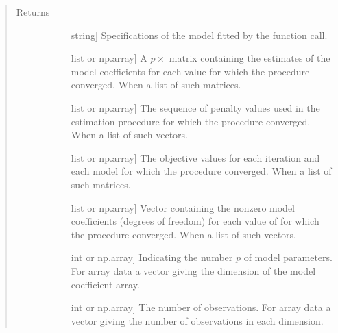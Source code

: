 \documentclass[letterpaper,10pt,english]{sphinxmanual}
\begin{document}
\begin{fulllineitems}
\begin{quote}
\begin{description}
\begin{description}
\end{description}

\item[{Returns}] \leavevmode\begin{description}
\item[{}] \leavevmode{[}string{]}
\sphinxAtStartPar
Specifications of the model fitted by the function call.

\item[{}] \leavevmode{[}list or np.array{]}
\sphinxAtStartPar
A \(p \times\)  matrix containing the
estimates of the model coefficients for each   \sphinxhyphen{}value
for which the procedure converged. When   
a   \sphinxhyphen{}list of such matrices.

\item[{}] \leavevmode{[}list or np.array{]}
\sphinxAtStartPar
The sequence of penalty values used
in the estimation procedure for which the procedure converged.
When    a   \sphinxhyphen{}list of such vectors.

\item[{}] \leavevmode{[}list or np.array{]}
\sphinxAtStartPar
The objective values for each
iteration and each model for which the procedure converged.
When    a   \sphinxhyphen{}list of such matrices.

\item[{}] \leavevmode{[}list or np.array{]}
\sphinxAtStartPar
Vector containing the nonzero model coefficients (degrees of freedom) for each
value of    for which the procedure converged. When
 a   \sphinxhyphen{}list of such vectors.

\item[{}] \leavevmode{[}int or np.array{]}
\sphinxAtStartPar
Indicating the number \(p\) of model parameters.
For array data a vector giving the dimension of the model coefficient array.

\item[{}] \leavevmode{[}int or np.array{]}
\sphinxAtStartPar
The number of observations. For array data a vector giving the number of  
observations in each dimension.


\end{description}
\end{description}
\end{quote}
\end{fulllineitems}
\end{document}
